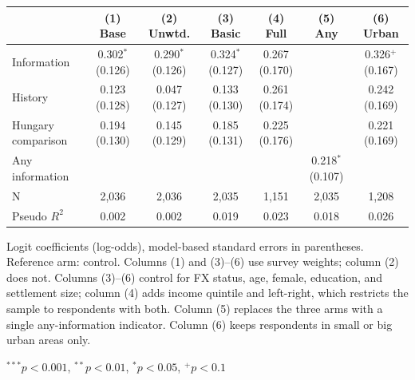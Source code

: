 \setlength{\tabcolsep}{4pt}
\begin{tabular}{lcccccc}
\toprule
& (1) Base & (2) Unwtd. & (3) Basic & (4) Full & (5) Any & (6) Urban \\
\midrule
Information & \makecell{0.302$^{*}$\\ (0.126)} & \makecell{0.290$^{*}$\\ (0.126)} & \makecell{0.324$^{*}$\\ (0.127)} & \makecell{0.267\\ (0.170)} &  & \makecell{0.326$^{+}$\\ (0.167)} \\
History & \makecell{0.123\\ (0.128)} & \makecell{0.047\\ (0.127)} & \makecell{0.133\\ (0.130)} & \makecell{0.261\\ (0.174)} &  & \makecell{0.242\\ (0.169)} \\
Hungary comparison & \makecell{0.194\\ (0.130)} & \makecell{0.145\\ (0.129)} & \makecell{0.185\\ (0.131)} & \makecell{0.225\\ (0.176)} &  & \makecell{0.221\\ (0.169)} \\
Any information &  &  &  &  & \makecell{0.218$^{*}$\\ (0.107)} &  \\
\midrule
N & 2,036 & 2,036 & 2,035 & 1,151 & 2,035 & 1,208 \\
Pseudo $R^2$ & 0.002 & 0.002 & 0.019 & 0.023 & 0.018 & 0.026 \\
\bottomrule
\end{tabular}

\vspace{0.5em}

{\footnotesize Logit coefficients (log-odds), model-based standard errors in parentheses. Reference arm: control. Columns (1) and (3)--(6) use survey weights; column (2) does not. Columns (3)--(6) control for FX status, age, female, education, and settlement size; column (4) adds income quintile and left-right, which restricts the sample to respondents with both. Column (5) replaces the three arms with a single any-information indicator. Column (6) keeps respondents in small or big urban areas only. \par}

{\footnotesize $^{***}p<0.001$, $^{**}p<0.01$, $^{*}p<0.05$, $^{+}p<0.1$ \par}
